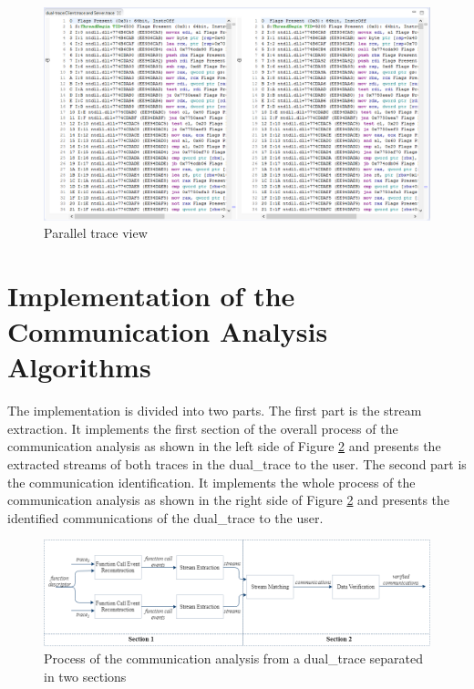 \begin{figure}[H]
\centerline{\includegraphics[scale=0.6]{Figures/paralleleditor}}
 \caption{Parallel trace view}
\label{parallelview}
\end{figure}

\section{Implementation of the Communication Analysis Algorithms}
The implementation is divided into two parts. The first part is the stream extraction. It implements the first section of the overall process of the communication analysis as shown in the left side of Figure \ref{overviewintwo} and presents the extracted streams of both traces in the dual\_trace to the user. The second part is the communication identification. It implements the whole process of the communication analysis as shown in the right side of Figure \ref{overviewintwo} and presents the identified communications of the dual\_trace to the user.

\begin{figure}[H]
\centerline{\includegraphics[scale=0.47]{Figures/overviewintwo}}
\caption{Process of the communication analysis from a dual\_trace separated in two sections}
\label{overviewintwo}
\end{figure}

